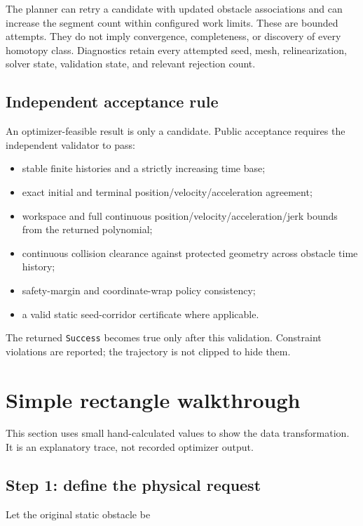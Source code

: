 \documentclass[10pt,letterpaper]{article}
\newcommand{\file}[1]{\nolinkurl{#1}}
\begin{document}
The planner can retry a candidate with updated obstacle associations and can
increase the segment count within configured work limits. These are bounded
attempts. They do not imply convergence, completeness, or discovery of every
homotopy class. Diagnostics retain every attempted seed, mesh, relinearization,
solver state, validation state, and relevant rejection count.

\subsection{Independent acceptance rule}

An optimizer-feasible result is only a candidate. Public acceptance requires
the independent validator to pass:

\begin{itemize}
  \item stable finite histories and a strictly increasing time base;
  \item exact initial and terminal position/velocity/acceleration agreement;
  \item workspace and full continuous position/velocity/acceleration/jerk
  bounds from the returned polynomial;
  \item continuous collision clearance against protected geometry across
  obstacle time history;
  \item safety-margin and coordinate-wrap policy consistency;
  \item a valid static seed-corridor certificate where applicable.
\end{itemize}

The returned \file{Success} becomes true only after this validation. Constraint
violations are reported; the trajectory is not clipped to hide them.

\section{Simple rectangle walkthrough}\label{sec:walkthrough}

This section uses small hand-calculated values to show the data transformation.
It is an explanatory trace, not recorded optimizer output.

\subsection{Step 1: define the physical request}

Let the original static obstacle be
\end{document}
